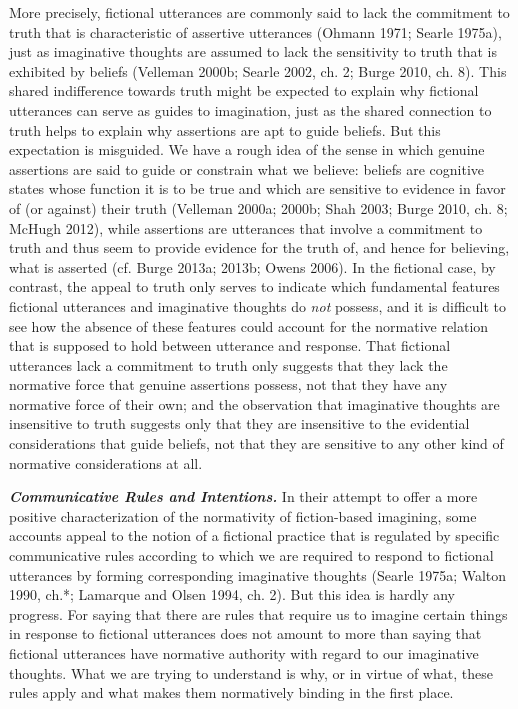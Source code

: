{More precisely, fictional utterances are commonly said to lack the commitment to truth that is characteristic of assertive utterances (Ohmann 1971; Searle 1975a), just as imaginative thoughts are assumed to lack the sensitivity to truth that is exhibited by beliefs (Velleman 2000b; Searle 2002, ch. 2; Burge 2010, ch. 8). This shared indifference towards truth might be expected to explain why fictional utterances can serve as guides to imagination, just as the shared connection to truth helps to explain why assertions are apt to guide beliefs. But this expectation is misguided. We have a rough idea of the sense in which genuine assertions are said to guide or constrain what we believe: beliefs are cognitive states whose function it is to be true and which are sensitive to evidence in favor of (or against) their truth (Velleman 2000a; 2000b; Shah 2003; Burge 2010, ch. 8; McHugh 2012), while assertions are utterances that involve a commitment to truth and thus seem to provide evidence for the truth of, and hence for believing, what is asserted (cf. Burge 2013a; 2013b; Owens 2006). In the fictional case, by contrast, the appeal to truth only serves to indicate which fundamental features fictional utterances and imaginative thoughts do \emph{not} possess, and it is difficult to see how the absence of these features could account for the normative relation that is supposed to hold between utterance and response. That fictional utterances lack a commitment to truth only suggests that they lack the normative force that genuine assertions possess, not that they have any normative force of their own; and the observation that imaginative thoughts are insensitive to truth suggests only that they are insensitive to the evidential considerations that guide beliefs, not that they are sensitive to any other kind of normative considerations at all.

\vspace{.2cm}
\noindent \textbf{\emph{Communicative Rules and Intentions.}} In their attempt to offer a more positive characterization of the normativity of fiction-based imagining, some accounts appeal to the notion of a fictional practice that is regulated by specific communicative rules according to which we are required to respond to fictional utterances by forming corresponding imaginative thoughts (Searle 1975a; Walton 1990, ch.*; Lamarque and Olsen 1994, ch. 2). But this idea is hardly any progress. For saying that there are rules that require us to imagine certain things in response to fictional utterances does not amount to more than saying that fictional utterances have normative authority with regard to our imaginative thoughts. What we are trying to understand is why, or in virtue of what, these rules apply and what makes them normatively binding in the first place.

}
